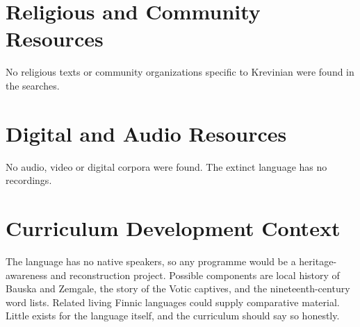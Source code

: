 \documentclass[12pt]{article}
\begin{document}
\section{Religious and Community Resources}
No religious texts or community organizations specific to Krevinian were found in the searches.

\section{Digital and Audio Resources}
No audio, video or digital corpora were found. The extinct language has no recordings.

\section{Curriculum Development Context}
The language has no native speakers, so any programme would be a heritage-awareness and reconstruction project. Possible components are local history of Bauska and Zemgale, the story of the Votic captives, and the nineteenth-century word lists. Related living Finnic languages could supply comparative material. Little exists for the language itself, and the curriculum should say so honestly.
\end{document}
